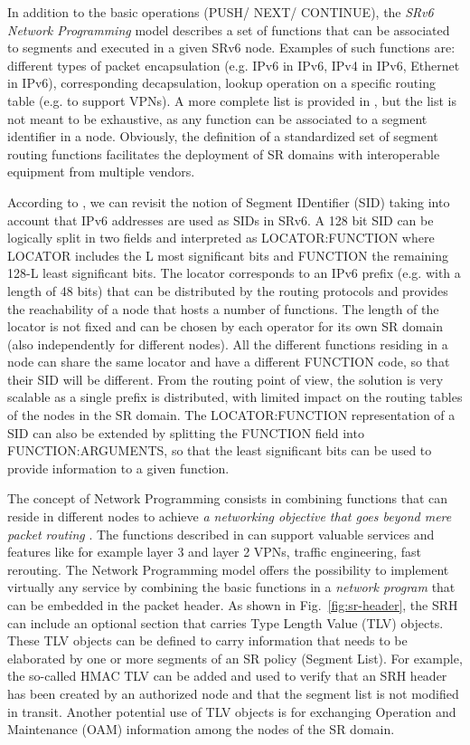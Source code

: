 In addition to the basic operations (PUSH/ NEXT/ CONTINUE), the \textit{SRv6 Network Programming} model \cite{id-srv6-network-prog} describes a set of functions that can be associated to segments and executed in a given SRv6 node. Examples of such functions are: different types of packet encapsulation (e.g. IPv6 in IPv6, IPv4 in IPv6, Ethernet in IPv6), corresponding decapsulation, lookup operation on a specific routing table (e.g. to support VPNs). A more complete list is provided in \cite{id-srv6-network-prog}, but the list is not meant to be exhaustive, as any function can be associated to a segment identifier in a node. Obviously, the definition of a standardized set of segment routing functions facilitates the deployment of SR domains with interoperable equipment from multiple vendors. 

According to \cite{id-srv6-network-prog}, we can revisit the notion of Segment IDentifier (SID) taking into account that IPv6 addresses are used as SIDs in SRv6. A 128 bit SID can be logically split in two fields and interpreted as LOCATOR:FUNCTION where LOCATOR includes the L most significant bits and FUNCTION the remaining 128-L least significant bits. The locator corresponds to an IPv6 prefix (e.g. with a length of 48 bits) that can be distributed by the routing protocols and provides the reachability of a node that hosts a number of functions. The length of the locator is not fixed and can be chosen by each operator for its own SR domain (also independently for different nodes). All the different functions residing in a node can share the same locator and have a different FUNCTION code, so that their SID will be different. From the routing point of view, the solution is very scalable as a single prefix is distributed, with limited impact on the routing tables of the nodes in the SR domain. The LOCATOR:FUNCTION representation of a SID can also be extended by splitting the FUNCTION field into FUNCTION:ARGUMENTS, so that the least significant bits can be used to provide information to a given function.

The concept of Network Programming consists in combining functions that can reside in different nodes to achieve \textit{a networking objective that goes beyond mere packet routing} \cite{id-srv6-network-prog}. The functions described in \cite{id-srv6-network-prog} can support valuable services and features like for example layer 3 and layer 2 VPNs, traffic engineering, fast rerouting. The Network Programming model offers the possibility to implement virtually any service by combining the basic functions in a \textit{network program} that can be embedded in the packet header. As shown in Fig.~\ref{fig:sr-header}, the SRH can include an optional section that carries Type Length Value (TLV) objects. These TLV objects can be defined to carry information that needs to be elaborated by one or more segments of an SR policy (Segment List). For example, the so-called HMAC TLV can be added and used to verify that an SRH header has been created by an authorized node and that the segment list is not modified in transit. Another potential use of TLV objects is for exchanging Operation and Maintenance (OAM) information among the nodes of the SR domain. 

